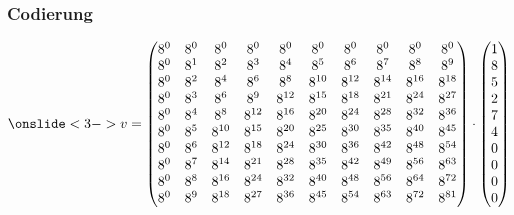 \documentclass[11pt,aspectratio=169]{beamer}
\begin{document}
	\begin{frame}
		\frametitle{Codierung}
		
		\begin{itemize}
			
			
		\end{itemize}
		
		\[
		\onslide<3->{
		v = \begin{pmatrix}
			8^0&    8^0&    8^0&    8^0&    8^0&    8^0&    8^0&    8^0&    8^0&    8^0\\
			8^0&	8^1&	8^2&	8^3&	8^4&	8^5&	8^6&	8^7&    8^8&	8^9\\
			8^0&	8^2&	8^4&	8^6&	8^8& 8^{10}& 8^{12}& 8^{14}& 8^{16}& 8^{18}\\
			8^0&	8^3&	8^6&	8^9& 8^{12}& 8^{15}& 8^{18}& 8^{21}& 8^{24}& 8^{27}\\
			8^0&	8^4&	8^8& 8^{12}& 8^{16}& 8^{20}& 8^{24}& 8^{28}& 8^{32}& 8^{36}\\
			8^0&	8^5& 8^{10}& 8^{15}& 8^{20}& 8^{25}& 8^{30}& 8^{35}& 8^{40}& 8^{45}\\
			8^0&	8^6& 8^{12}& 8^{18}& 8^{24}& 8^{30}& 8^{36}& 8^{42}& 8^{48}& 8^{54}\\
			8^0&	8^7& 8^{14}& 8^{21}& 8^{28}& 8^{35}& 8^{42}& 8^{49}& 8^{56}& 8^{63}\\
			8^0&	8^8& 8^{16}& 8^{24}& 8^{32}& 8^{40}& 8^{48}& 8^{56}& 8^{64}& 8^{72}\\
			8^0&	8^9& 8^{18}& 8^{27}& 8^{36}& 8^{45}& 8^{54}& 8^{63}& 8^{72}& 8^{81}\\
		\end{pmatrix}
		\cdot
		\begin{pmatrix}
			1 \\ 8 \\ 5 \\ 2 \\ 7 \\ 4 \\ 0 \\ 0 \\ 0 \\ 0 \\
		\end{pmatrix}
		}
		\]
		
		\begin{itemize}
			\onslide<4->{\item $v = [5,3,6,5,2,10,2,7,10,4]$}
		\end{itemize}
		
	\end{frame}
\end{document}
